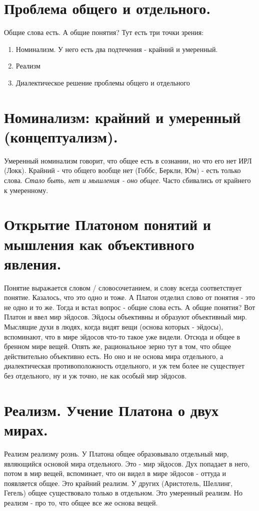 \section{ Проблема общего и отдельного.}
Общие слова есть. А общие понятия? Тут есть три точки зрения:
\begin{enumerate}
\item Номинализм. У него есть два подтечения - крайний и умеренный.
\item Реализм
\item Диалектическое решение проблемы общего и отдельного
\end{enumerate}

\section{ Номинализм: крайний и умеренный (концептуализм).}
Умеренный номинализм говорит, что общее есть в сознании, но что его нет ИРЛ (Локк). Крайний - что общего вообще нет (Гоббс, Беркли, Юм) - есть только слова. \textit{Стало быть, нет и мышления - оно общее}. Часто сбивались от крайнего к умеренному.

\section{ Открытие Платоном понятий и мышления как объективного явления.}
Понятие выражается словом / словосочетанием, и слову всегда соответствует понятие. Казалось, что это одно и тоже. А Платон отделил слово от понятия - это не одно и то же. Тогда и встал вопрос -  общие слова есть. А общие понятия? Вот Платон и ввел мир эйдосов. Эйдосы объективны и образуют объективный мир. Мыслящие духи в людях, когда видят вещи (основа которых - эйдосы), вспоминают, что в мире эйдосов что-то такое уже видели. Отсюда и общее в бренном мире вещей. Опять же, рациональное зерно тут в том, что общее действительно объективно есть. Но оно и не основа мира отдельного, а диалектическая противоположность отдельного, и уж тем более не существует без отдельного, ну и уж точно, не  как особый мир эйдосов. 

\section{ Реализм. Учение Платона о двух мирах.}
Реализм реализму рознь. У Платона общее образовывало отдельный мир, являющийся основой мира отдельного. Это - мир эйдосов. Дух попадает в него, потом в мир вещей, вспоминает, что он видел в мире эйдосов - оттуда и появляется общее. Это крайний реализм. У других (Аристотель, Шеллинг, Гегель) общее существовало только в отдельном. Это умеренный реализм. Но реализм - про то, что общее все же основа вещей.

